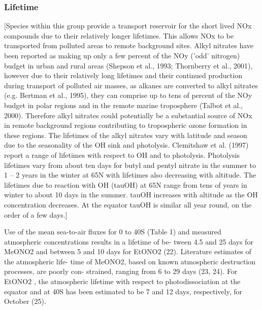\documentclass[11pt,a4paper]{article}
\begin{document}
\subsubsection*{Lifetime}
\citep{Newland2013}
[Species within this group provide a transport reservoir for the short lived NOx compounds due to their relatively longer lifetimes. This allows NOx to be transported from polluted areas to remote background sites. Alkyl nitrates have been reported as making up only a few percent of the NOy ('odd' nitrogen) budget in urban and rural areas (Shepson et al., 1993; Thornberry et al., 2001), however due to their relatively long lifetimes and their continued production during transport of polluted air masses, as alkanes are converted to alkyl nitrates (e.g. Bertman et al., 1995), they can comprise up to tens of percent of the NOy budget in polar regions and in the remote marine troposphere (Talbot et al., 2000). Therefore alkyl nitrates could potentially be a substantial source of NOx in remote background regions contributing to tropospheric ozone formation in these regions.
The lifetimes of the alkyl nitrates vary with latitude and season due to the seasonality of the OH sink and photolysis. Clemitshaw et al. (1997) report a range of lifetimes with respect to OH and to photolysis. Photolysis lifetimes vary from about ten days for butyl and pentyl nitrate in the summer to 1 – 2 years in the winter at 65N with lifetimes also decreasing with altitude. The lifetimes due to reaction with OH (tauOH) at 65N range from tens of years in
winter to about 10 days in the summer. tauOH increases with altitude as the OH concentration decreases. At the equator tauOH is similar all year round, on the order of a few days.]

\citep{Chuck2002}
Use of the mean sea-to-air fluxes for 0 to 40S (Table 1) and measured atmospheric concentrations results in a lifetime of be- tween 4.5 and 25 days for MeONO2 and between 5 and 10 days for EtONO2 (22). Literature estimates of the atmospheric life- time of MeONO2, based on known atmospheric destruction processes, are poorly con- strained, ranging from 6 to 29 days (23, 24). For EtONO2
, the atmospheric lifetime with respect to photodissociation at the equator and at 40S has been estimated to be 7 and 12 days, respectively, for October (25).
\end{document}
